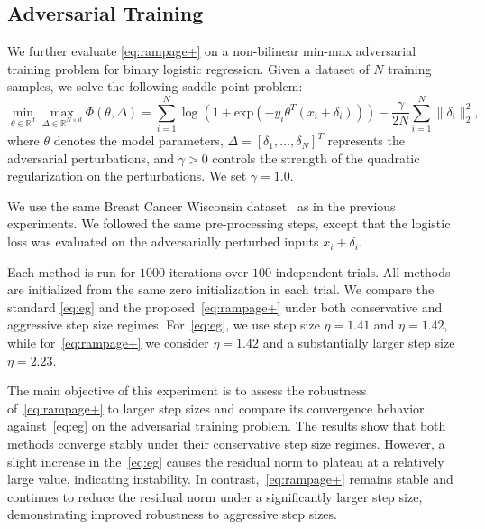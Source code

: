 \documentclass[letter,11pt]{article}
\begin{document}
\subsection{Adversarial Training}\label{sec:exp-5}
We further evaluate \eqref{eq:rampage+} on a non-bilinear min-max adversarial training problem for binary logistic regression. Given a  dataset of $N$ training samples, we solve the following saddle-point problem:
\begin{equation}
    \min_{\theta\in \mathbb{R}^d}\max_{\Delta\in \mathbb{R}^{N\times d}} \Phi(\theta, \Delta) = \sum_{i=1}^N\log\left(1 + \mathrm{exp}(-y_i \theta^T(x_i + \delta_i))\right) - \frac{\gamma}{2N}\sum_{i=1}^N\|\delta_i\|_2^2,
\end{equation}where $\theta$ denotes the model parameters, $\Delta=[\delta_1,\ldots,\delta_N]^T$ represents the adversarial perturbations, and $\gamma >0$ controls the strength of the quadratic regularization on the perturbations. We set $\gamma=1.0$.  

We use the same Breast Cancer Wisconsin dataset~\cite{breast_cancer_wisconsin_diagnostic_17} as in the previous experiments. We followed the same pre-processing steps, except that the logistic loss was evaluated on the adversarially perturbed inputs $x_i+\delta_i$. 

Each method is run for $1000$ iterations over $100$ independent trials. All methods are initialized from the same zero initialization in each trial. We compare the standard \eqref{eq:eg} and the proposed~\eqref{eq:rampage+} under both conservative and aggressive step size regimes. For~\eqref{eq:eg}, we use step size $\eta=1.41$ and $\eta =1.42$, while for~\eqref{eq:rampage+} we consider $\eta = 1.42$ and a substantially larger step size $\eta=2.23$. 

The main objective of this experiment is to assess the robustness of~\eqref{eq:rampage+} to larger step sizes and compare its convergence behavior against~\eqref{eq:eg} on the adversarial training problem. The results show that both methods converge stably under their conservative step size regimes. However, a slight increase in the~\eqref{eq:eg} causes the residual norm to plateau at a relatively large value, indicating instability. In contrast,~\eqref{eq:rampage+} remains stable and continues to reduce the residual norm under a significantly larger step size, demonstrating improved robustness to aggressive step sizes. 
\end{document}
